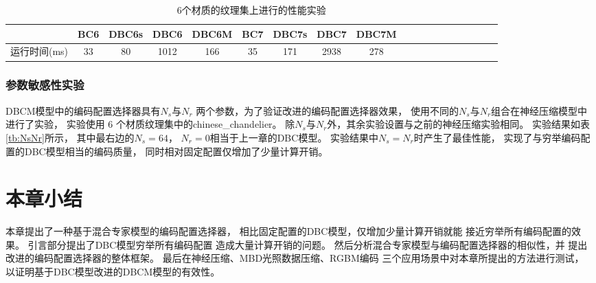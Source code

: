 \begin{table*}[htbp]
    \centering
    \caption{6个材质的纹理集上进行的性能实验}
    \label{4:6个材质的纹理集上进行的性能实验}        
    \begin{tabular}{ccccccccccccccccccc}
        \toprule
                     & BC6 & DBC6s & DBC6 &DBC6M& BC7  & DBC7s & DBC7 &DBC7M\\
        \midrule
        运行时间(ms)  & 33  &  80   & 1012 & 166   & 35   & 171 & 2938 &  278 \\
        \bottomrule
\end{tabular} %
\end{table*}

\subsubsection{参数敏感性实验}

DBCM模型中的编码配置选择器具有$N_s$与$N_r$
两个参数，为了验证改进的编码配置选择器效果，
使用不同的$N_s$与$N_r$组合在神经压缩模型中进行了实验，
实验使用 6 个材质纹理集中的chinese\_chandelier。
除$N_s$与$N_r$外，其余实验设置与之前的神经压缩实验相同。
实验结果如表\ref{tb:NsNr}所示，
其中最右边的$N_s=64$， $N_r=0$相当于上一章的DBC模型。
实验结果中$N_s=N_r$时产生了最佳性能，
实现了与穷举编码配置的DBC模型相当的编码质量，
同时相对固定配置仅增加了少量计算开销。

\begin{table*}[htbp]
    \centering
    \caption{ $N_s$与$N_r$的参数敏感性实验结果}
    \label{tb:NsNr}
\end{table*}

\section{本章小结}

本章提出了一种基于混合专家模型的编码配置选择器，
相比固定配置的DBC模型，仅增加少量计算开销就能
接近穷举所有编码配置的效果。
引言部分提出了DBC模型穷举所有编码配置
造成大量计算开销的问题。
然后分析混合专家模型与编码配置选择器的相似性，并
提出改进的编码配置选择器的整体框架。
最后在神经压缩、MBD光照数据压缩、RGBM编码
三个应用场景中对本章所提出的方法进行测试，
以证明基于DBC模型改进的DBCM模型的有效性。